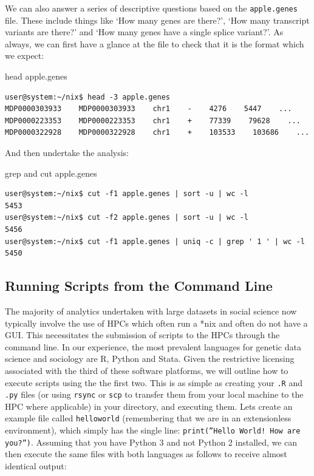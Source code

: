 \documentclass[11pt]{article}
\begin{document}
We can also answer a series of descriptive questions based on the \texttt{apple.genes} file. These include things like `How many genes are there?', `How many transcript variants are there?' and `How many genes have a single splice variant?'. As always, we can first have a glance at the file to check that it is the format which we expect: \\

\begin{listing}[H]
\caption{head apple.genes}\vspace{-0.1in}
\begin{verbatim}
user@system:~/nix$ head -3 apple.genes
MDP0000303933    MDP0000303933    chr1    -    4276    5447    ...
MDP0000223353    MDP0000223353    chr1    +    77339    79628    ...
MDP0000322928    MDP0000322928    chr1    +    103533    103686    ...
\end{verbatim}
\end{listing}

\noindent
And then undertake the analysis: \\

\begin{listing}[H]
\caption{grep and cut apple.genes}\vspace{-0.1in}
\begin{verbatim}
user@system:~/nix$ cut -f1 apple.genes | sort -u | wc -l
5453 
user@system:~/nix$ cut -f2 apple.genes | sort -u | wc -l
5456 
user@system:~/nix$ cut -f1 apple.genes | uniq -c | grep ' 1 ' | wc -l
5450
\end{verbatim}
\end{listing}

\subsection{Running Scripts from the Command Line}

The majority of analytics undertaken with large datasets in social science now typically involve the use of HPCs which often run a *nix and often do not have a GUI. This necessitates the submission of scripts to the HPCs through the command line. In our experience, the most prevalent languages for genetic data science and sociology are R, Python and Stata. Given the restrictive licensing associated with the third of these software platforms, we will outline how to execute scripts using the the first two. This is as simple as creating your \texttt{.R} and \texttt{.py} files (or using \texttt{rsync} or \texttt{scp} to transfer them from your local machine to the HPC where applicable) in your directory, and executing them. Lets create an example file called \texttt{helloworld} (remembering that we are in an extensionless environment), which simply has the single line: \texttt{print(''Hello World! How are you?'')}. Assuming that you have Python 3 and not Python 2 installed, we can then execute the same files with both languages as follows to receive almost identical output:\\
\end{document}
